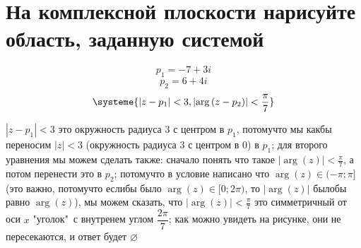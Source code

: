 \documentclass{article}
\newcommand{\ds}{\displaystyle}
\newcommand{\abs}[1]{\left|#1\right|}
\newcommand{\Arg}[1]{\arg\left(#1\right)}
\begin{document}
  \section{На комплексной плоскости нарисуйте область, заданную системой}
  $$ p_1 = -7+3i $$
  $$ p_2 = 6+4i $$
  \[
    \systeme{
      \abs{z-p_1} < 3,
      \abs{\Arg{z-p_2}} < \dfrac{\pi}{7}
    }
  \]
  \begin{wrapfigure}{r}{5cm}
    \vspace{-3.25cm}
    \centering
    \vspace{-.5cm}
  \end{wrapfigure}
  $\abs{z-p_1} < 3$ это окружность радиуса $3$ с центром в $p_1$,
  потомучто мы какбы переносим $\abs{z} < 3$ (окружность радиуса $3$ с центром в $0$) в $p_1$;
  для второго уравнения мы можем сделать также: сначало понять что такое $\ds \abs{\Arg{z}} < \frac{\pi}{7}$,
  а потом перенести это в $p_2$;
  потомучто в условие написано что $\Arg{z} \in (-\pi;\pi]$
  (это важно, потомучто еслибы было $\Arg{z} \in [0;2\pi)$, то $\abs{\Arg{z}}$ былобы равно $\Arg{z}$),
  мы можем сказать, что $\ds \abs{\Arg{z}} < \frac{\pi}{7}$ это симметричный от оси $x$ "уголок"\ с внутренем углом $\dfrac{2\pi}{7}$;
  как можно увидеть на рисунке, они не пересекаются, и ответ будет $\varnothing$
\end{document}
